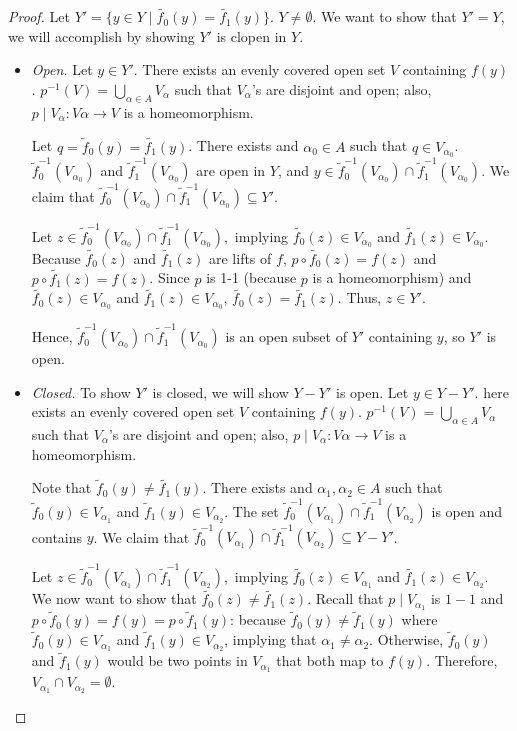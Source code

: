 \documentclass[11pt,reqno]{article}
\theoremstyle{definition}
\begin{document}
\begin{proof}
Let $Y' =\{y\in Y\mid \widetilde{f_0}(y)=\widetilde{f_1}(y)\}$. $Y\ne\emptyset$. We want to show that $Y' = Y$, we will accomplish by showing $Y'$ is clopen in $Y$. 
\begin{itemize}
\item\textit{Open.} Let $y\in Y'$. There exists an evenly covered open set $V$ containing $f(y)$. $p^{-1}(V)=\displaystyle\bigcup_{\alpha\in A} V_\alpha$ such that $V_{\alpha}$'s are disjoint and open; also, $p\mid V_\alpha:V\alpha\rightarrow V$ is a homeomorphism. 

Let $q= \widetilde{f}_0(y)=\widetilde{f_1}(y)$. There exists and $\alpha_0\in A$ such that $q\in V_{\alpha_0}$. $\widetilde{f}_0^{-1}(V_{\alpha_0})$ and $\widetilde{f}_1^{-1}(V_{\alpha_0})$ are open in $Y$, and $y\in \widetilde{f}_0^{-1}(V_{\alpha_0})\cap\widetilde{f}_1^{-1}(V_{\alpha_0})$.
We claim that $\widetilde{f}_0^{-1}(V_{\alpha_0})\cap\widetilde{f}_1^{-1}(V_{\alpha_0})\subseteq Y'.$

Let $z\in \widetilde{f}_0^{-1}(V_{\alpha_0})\cap\widetilde{f}_1^{-1}(V_{\alpha_0}),$ implying $\widetilde{f_0}(z)\in V_{\alpha_0}$ and $\widetilde{f_1}(z)\in V_{\alpha_0}$. Because $\widetilde{f_0}(z)$ and $\widetilde{f_1}(z)$ are lifts of $f$, $p\circ\widetilde{f_0}(z)=f(z)$ and $p\circ\widetilde{f_1}(z)=f(z)$. Since $p$ is 1-1 (because $p$ is a homeomorphism) and $\widetilde{f_0}(z)\in V_{\alpha_0}$ and $\widetilde{f_1}(z)\in V_{\alpha_0}$, $\widetilde{f_0}(z)=\widetilde{f_1}(z)$. Thus, $z\in Y'$.

Hence, $\widetilde{f}_0^{-1}(V_{\alpha_0})\cap\widetilde{f}_1^{-1}(V_{\alpha_0})$ is an open subset of $Y'$ containing $y$, so $Y'$ is open.
\item\textit{Closed.} To show $Y'$ is closed, we will show $Y-Y'$ is open. Let $y\in Y-Y'$. here exists an evenly covered open set $V$ containing $f(y)$. $p^{-1}(V)=\displaystyle\bigcup_{\alpha\in A} V_\alpha$ such that $V_{\alpha}$'s are disjoint and open; also, $p\mid V_\alpha:V\alpha\rightarrow V$ is a homeomorphism. 

Note that $\widetilde{f}_0(y)\ne\widetilde{f_1}(y)$. There exists and $\alpha_1,\alpha_2\in A$ such that $\widetilde{f}_0(y)\in V_{\alpha_1}$ and $\widetilde{f}_1(y)\in V_{\alpha_2}$. The set $\widetilde{f}_0^{-1}(V_{\alpha_1})\cap\widetilde{f}_1^{-1}(V_{\alpha_2})$ is open and contains $y$. We claim that $\widetilde{f}_0^{-1}(V_{\alpha_1})\cap\widetilde{f}_1^{-1}(V_{\alpha_2})\subseteq Y-Y'$.

Let $z\in \widetilde{f}_0^{-1}(V_{\alpha_1})\cap\widetilde{f}_1^{-1}(V_{\alpha_2}),$ implying $\widetilde{f_0}(z)\in V_{\alpha_1}$ and $\widetilde{f_1}(z)\in V_{\alpha_2}$. We now want to show that $\widetilde{f_0}(z)\ne\widetilde{f_1}(z)$. Recall that $p\mid V_{\alpha_1}$ is $1-1$ and $p\circ\widetilde{f}_0(y)=f(y)=p\circ\widetilde{f}_1(y)$: because $\widetilde{f}_0(y)\ne\widetilde{f}_1(y)$ where $\widetilde{f}_0(y)\in V_{\alpha_1}$ and $\widetilde{f}_1(y)\in V_{\alpha_2}$, implying that $\alpha_1\ne \alpha_2$. Otherwise, $\widetilde{f}_0(y)$ and $\widetilde{f}_1(y)$ would be two points in $V_{\alpha_1}$ that both map to $f(y)$. Therefore, $V_{\alpha_1}\cap V_{\alpha_2}=\emptyset$.


\end{itemize}
\end{proof}
\end{document}
